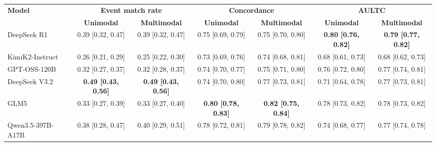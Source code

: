 \begin{table}[t]
{\footnotesize
\setlength{\tabcolsep}{3pt}
\renewcommand{\arraystretch}{1.12}
{
\begin{adjustbox}{max width=\textwidth}
\begin{tabular}{lcccccc}
\hline
\multirow{2}{*}{\textbf{Model}} 
& \multicolumn{2}{c}{\textbf{Event match rate}} 
& \multicolumn{2}{c}{\textbf{Concordance}} 
& \multicolumn{2}{c}{\textbf{AULTC}} \\
\cline{2-7}
& \textbf{Unimodal} & \textbf{Multimodal} 
& \textbf{Unimodal} & \textbf{Multimodal} 
& \textbf{Unimodal} & \textbf{Multimodal} \\
\hline
DeepSeek R1
& 0.39 [0.32, 0.47]
& 0.39 [0.32, 0.47]
& 0.75 [0.69, 0.79]
& 0.75 [0.70, 0.80]
& \textbf{0.80 [0.76, 0.82]} 
& \textbf{0.79 [0.77, 0.82]}\\

KimiK2-Instruct
& 0.26 [0.21, 0.29]
& 0.25 [0.22, 0.30]
& 0.73 [0.69, 0.76]
& 0.74 [0.68, 0.81]
& 0.68 [0.61, 0.73]
& 0.68 [0.62, 0.73] \\

GPT-OSS-120B
& 0.32 [0.27, 0.37]
& 0.32 [0.28, 0.37]
& 0.74 [0.70, 0.77]
& 0.75 [0.71, 0.80]
& 0.76 [0.72, 0.80] 
& 0.77 [0.74, 0.81]\\

DeepSeek V3.2
& \textbf{0.49 [0.43, 0.56]}
& \textbf{0.49 [0.43, 0.56]}
& 0.74 [0.70, 0.80]
& 0.77 [0.73, 0.81]
& 0.71 [0.64, 0.78] 
& 0.77 [0.73, 0.81]\\

GLM5
& 0.33 [0.27, 0.39]
& 0.33 [0.27, 0.40]
& \textbf{0.80 [0.78, 0.83]}
& \textbf{0.82 [0.75, 0.84]}
& 0.78 [0.73, 0.82] 
& 0.78 [0.73, 0.82]\\

Qwen3.5-397B-A17B
& 0.38 [0.28, 0.47]
& 0.40 [0.29, 0.51]
& 0.78 [0.72, 0.81]
& 0.79 [0.78, 0.82]
& 0.74 [0.68, 0.77] 
& 0.77 [0.74, 0.78]\\

\hline
\end{tabular}
\end{adjustbox}
}
\label{tab:main_results_threshold_01}
}
\vspace{-3mm}
\end{table}